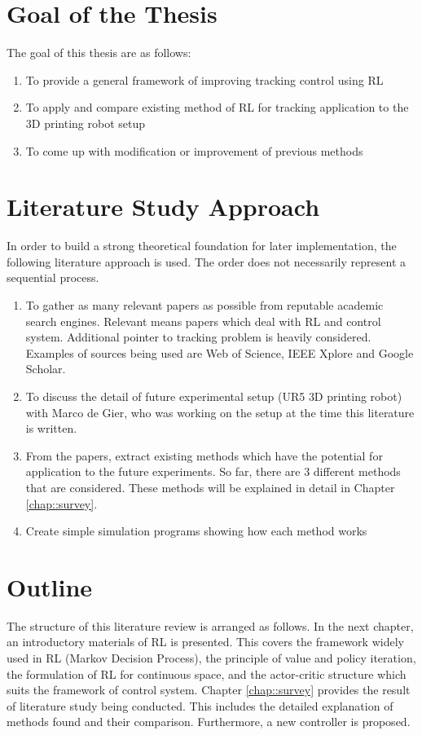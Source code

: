 \section{Goal of the Thesis}

The goal of this thesis are as follows:
\begin{enumerate}
\item To provide a general framework of improving tracking control using \ac{RL}
\item To apply and compare existing method of \ac{RL} for tracking application to the 3D printing robot setup
\item To come up with modification or improvement of previous methods
\end{enumerate}

\section{Literature Study Approach}
In order to build a strong theoretical foundation for later implementation, the following literature approach is used. The order does not necessarily represent a sequential process.
\begin{enumerate}
	\item To gather as many relevant papers as possible from reputable academic search engines. Relevant means papers which deal with \ac{RL} and control system. Additional pointer to tracking problem is heavily considered. Examples of sources being used are Web of Science, IEEE Xplore and Google Scholar.
	\item To discuss the detail of future experimental setup (UR5 \ac{3D} printing robot) with Marco de Gier, who was working on the setup at the time this literature is written.
	\item From the papers, extract existing methods which have the potential for application to the future experiments. So far, there are 3 different methods that are considered. These methods will be explained in detail in Chapter \ref{chap::survey}.
	\item Create simple simulation programs showing how each method works
	
\end{enumerate}


\section{Outline}

The structure of this literature review is arranged as follows. In the next chapter, an introductory materials of \ac{RL} is presented. This covers the framework widely used in \ac{RL} (Markov Decision Process), the principle of value and policy iteration, the formulation of \ac{RL} for continuous space, and the actor-critic structure which suits the framework of control system. Chapter \ref{chap::survey} provides the result of literature study being conducted. This includes the detailed explanation of methods found and their comparison. Furthermore, a new controller is proposed. 



